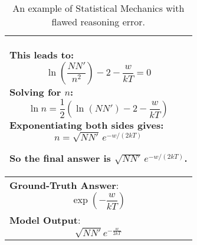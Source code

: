 \begin{table}[!t]
{\begin{tabular}{p{10cm}}
   This leads to:
   \[
   \ln\left(\frac{N N'}{n^2}\right) - 2 - \frac{w}{kT} = 0
   \]
   Solving for \( n \):
   \[
   \ln n = \frac{1}{2} \left( \ln(N N') - 2 - \frac{w}{kT} \right)
   \]
   Exponentiating both sides gives:
   \[
   n = \sqrt{N N'} \, e^{-w/(2kT)}
   \]

So the final answer is \( \boxed{\sqrt{N N'} \, e^{-w/(2kT)}} \).\\
\midrule
\textbf{Ground-Truth Answer}: 
\[
\exp\left(-\frac{w}{kT}\right)
\]
\\
\midrule
\textbf{Model Output}: 
\[
\sqrt{NN'} e^{-\frac{w}{2kT}}
\]

\\
\bottomrule
\end{tabular}%
}
\caption{An example of Statistical Mechanics with flawed reasoning error.}
\label{tabapp:error example 2}
\end{table}

